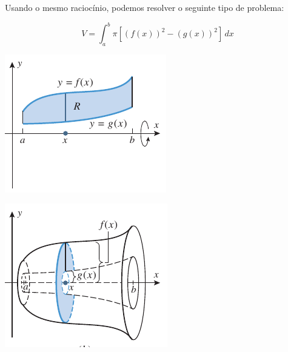 \begin{frame}
Usando o mesmo raciocínio, podemos resolver o seguinte tipo de problema:

\[V=\int_a^b \pi \left[\left(f(x)\right)^2-\left(g(x)\right)^2\right]\,dx\]

\begin{center}
\begin{minipage}{0.45\textwidth}
\includegraphics[scale=.5]{figuras/arruela1.png}
\end{minipage}
\begin{minipage}{0.45\textwidth}
\includegraphics[scale=.5]{figuras/arruela2.png}
\end{minipage}
\end{center}
\end{frame}



